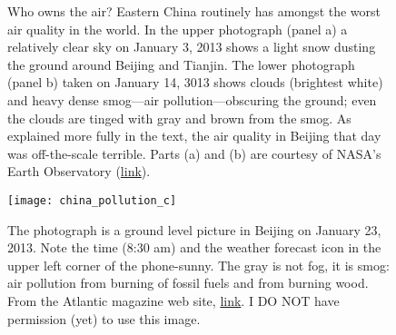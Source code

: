 \begin{figure}[p]
\centering
{}


\caption{Who owns the air? Eastern China routinely has amongst the worst air quality in the world. In the upper photograph (panel a) a relatively clear sky on January 3, 2013 shows a light snow dusting the ground around Beijing and Tianjin. The lower photograph (panel b) taken on January 14, 3013 shows clouds (brightest white) and heavy dense smog---air pollution---obscuring the ground; even the clouds are tinged with gray and brown from the smog. As explained more fully in the text, the air quality in Beijing that day was off-the-scale terrible.  Parts (a) and (b) are courtesy of NASA's Earth Observatory (\href{http://earthobservatory.nasa.gov/IOTD/view.php?id=80152&src=ve}{link}).}
\label{fig:china_pollution_ab}

\end{figure}

\newpage
\begin{figure}[p]
\centering
\texttt{[image: china\_pollution\_c]}%

\caption{The photograph is a ground level picture in Beijing on January 23, 2013. Note the time (8:30 am) and the weather forecast icon in the upper left corner of the phone-sunny. The gray is not fog, it is smog: air pollution from burning of fossil fuels and from burning wood. From the Atlantic magazine web site, \href{http://www.theatlantic.com/photo/2013/01/chinas-toxic-sky/100449/}{link}. I DO NOT have permission (yet) to use this image.}

\label{fig:china_pollution_c}

\end{figure}

